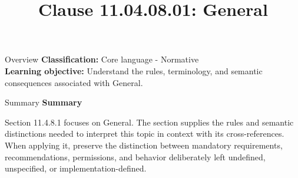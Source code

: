\documentclass[10pt,letterpaper]{article}
\title{Clause 11.04.08.01: General}
\author{}
\date{}
\begin{document}
\maketitle
\begin{CornellOverviewBox}{Overview}
\textbf{Classification:} Core language - Normative\\[2pt]
\textbf{Learning objective:} Understand the rules, terminology, and semantic consequences associated with General.
\end{CornellOverviewBox}\begin{CornellSummaryBox}{Summary}
{\sffamily\bfseries\color{Accent} Summary}\par\vspace{3pt}Section 11.4.8.1 focuses on General. The section supplies the rules and semantic distinctions needed to interpret this topic in context with its cross-references. When applying it, preserve the distinction between mandatory requirements, recommendations, permissions, and behavior deliberately left undefined, unspecified, or implementation-defined.
\end{CornellSummaryBox}
\end{document}
